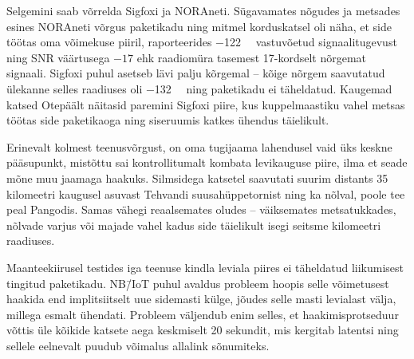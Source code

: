 \documentclass[12pt]{article}
\begin{document}
    Selgemini saab võrrelda Sigfoxi ja NORAneti.
    Sügavamates nõgudes ja metsades esines NORAneti võrgus paketikadu ning mitmel korduskatsel oli näha, et side töötas oma võimekuse piiril, raporteerides \SI{-122}{\deci\belm} vastuvõetud signaalitugevust ning SNR väärtusega $-17$ ehk raadiomüra tasemest 17-kordselt nõrgemat signaali.
    Sigfoxi puhul asetseb lävi palju kõrgemal -- kõige nõrgem saavutatud ülekanne selles raadiuses oli \SI{-132}{\deci\belm} ning paketikadu ei täheldatud.
    Kaugemad katsed Otepäält näitasid paremini Sigfoxi piire, kus kuppelmaastiku vahel metsas töötas side paketikaoga ning siseruumis katkes ühendus täielikult.

    Erinevalt kolmest teenusvõrgust, on oma tugijaama lahendusel vaid üks keskne pääsupunkt, mistõttu sai kontrollitumalt kombata levikauguse piire, ilma et seade mõne muu jaamaga haakuks.
    Silmsidega katsetel saavutati suurim distants 35 kilomeetri kaugusel asuvast Tehvandi suusahüppetornist ning ka nõlval, poole tee peal Pangodis.
    Samas vähegi reaalsemates oludes -- väiksemates metsatukkades, nõlvade varjus või majade vahel kadus side täielikult isegi seitsme kilomeetri raadiuses.

    Maanteekiirusel testides iga teenuse kindla leviala piires ei täheldatud liikumisest tingitud paketikadu.
    NB\=/IoT puhul avaldus probleem hoopis selle võimetusest haakida end implitsiitselt uue sidemasti külge, jõudes selle masti levialast välja, millega esmalt ühendati.
    Probleem väljendub enim selles, et haakimisprotseduur võttis üle kõikide katsete aega keskmiselt 20 sekundit, mis kergitab latentsi ning sellele eelnevalt puudub võimalus allalink sõnumiteks.
\end{document}
